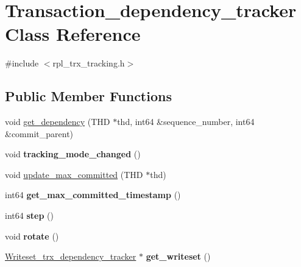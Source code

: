 \hypertarget{classTransaction__dependency__tracker}{}\section{Transaction\+\_\+dependency\+\_\+tracker Class Reference}
\label{classTransaction__dependency__tracker}


{\ttfamily \#include $<$rpl\+\_\+trx\+\_\+tracking.\+h$>$}

\subsection*{Public Member Functions}
\begin{DoxyCompactItemize}
\item 
void \mbox{\hyperlink{classTransaction__dependency__tracker_a8d2a4a5fbf55ca180fc23f4166be212f}{get\+\_\+dependency}} (T\+HD $\ast$thd, int64 \&sequence\+\_\+number, int64 \&commit\+\_\+parent)
\item 
\mbox{\label{classTransaction__dependency__tracker_abe7efcff7701487a3be223ba29160d9a}} 
void {\bfseries tracking\+\_\+mode\+\_\+changed} ()
\item 
void \mbox{\hyperlink{classTransaction__dependency__tracker_a8788b724314af256987da1595a3a42d7}{update\+\_\+max\+\_\+committed}} (T\+HD $\ast$thd)
\item 
\mbox{\label{classTransaction__dependency__tracker_aa7b1161abe944975d71a6936e974aae5}} 
int64 {\bfseries get\+\_\+max\+\_\+committed\+\_\+timestamp} ()
\item 
\mbox{\label{classTransaction__dependency__tracker_aad5125f93f22d31f845b9be0a0cdc1c9}} 
int64 {\bfseries step} ()
\item 
\mbox{\label{classTransaction__dependency__tracker_a75a9dc39e9ad8cf98f7dc79db6b485e7}} 
void {\bfseries rotate} ()
\item 
\mbox{\label{classTransaction__dependency__tracker_ac655a8a6f54c2f224792f9ef95698c43}} 
\mbox{\hyperlink{classWriteset__trx__dependency__tracker}{Writeset\+\_\+trx\+\_\+dependency\+\_\+tracker}} $\ast$ {\bfseries get\+\_\+writeset} ()
\end{DoxyCompactItemize}
